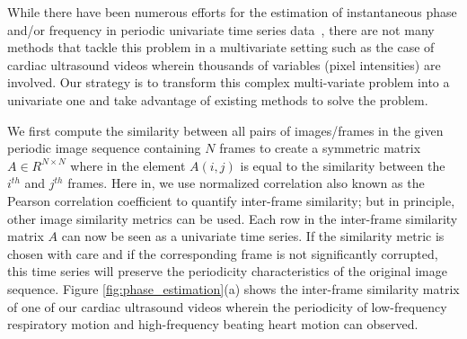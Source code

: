 \documentclass[runningheads,a4paper]{llncs}
\begin{document}
%
While there have been numerous efforts for the estimation of instantaneous phase and/or frequency in periodic univariate time series data~\cite{Boashash1992}, there are not many methods that tackle this problem in a multivariate setting such as the case of cardiac ultrasound videos wherein thousands of variables (pixel intensities) are involved. Our strategy is to transform this complex multi-variate problem into a univariate one and take advantage of existing methods to solve the problem. 

	We first compute the similarity between all pairs of images/frames in the given periodic image sequence containing $N$ frames to create a symmetric matrix $A \in R^{N \times N}$ where in the element $A(i,j)$ is equal to the similarity between the $i^{th}$ and $j^{th}$ frames. Here in, we use normalized correlation also known as the Pearson correlation coefficient to quantify inter-frame similarity; but in principle, other image similarity metrics can be used. Each row in the inter-frame similarity matrix $A$ can now be seen as a univariate time series. If the similarity metric is chosen with care and if the corresponding frame is not significantly corrupted, this time series will preserve the periodicity characteristics of the original image sequence. Figure \ref{fig:phase_estimation}(a) shows the inter-frame similarity matrix of one of our cardiac ultrasound videos wherein the periodicity of low-frequency respiratory motion and high-frequency beating heart motion can observed. 
\end{document}
